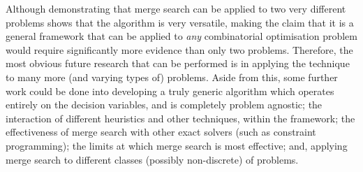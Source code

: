 \documentclass[journal]{IEEEtran}
\begin{document}
Although demonstrating that merge search can be applied to two very different problems shows that the algorithm is very versatile, making the claim that it is a general framework that can be applied to \emph{any} combinatorial optimisation problem would require significantly more evidence than only two problems. Therefore, the most obvious future research that can be performed is in applying the technique to many more (and varying types of) problems. Aside from this, some further work could be done into developing a truly generic algorithm which operates entirely on the decision variables, and is completely problem agnostic; the interaction of different heuristics and other techniques, within the framework; the effectiveness of merge search with other exact solvers (such as constraint programming); the limits at which merge search is most effective; and, applying merge search to different classes (possibly non-discrete) of problems.


% 
% 
% 
% 

 


\end{document}
